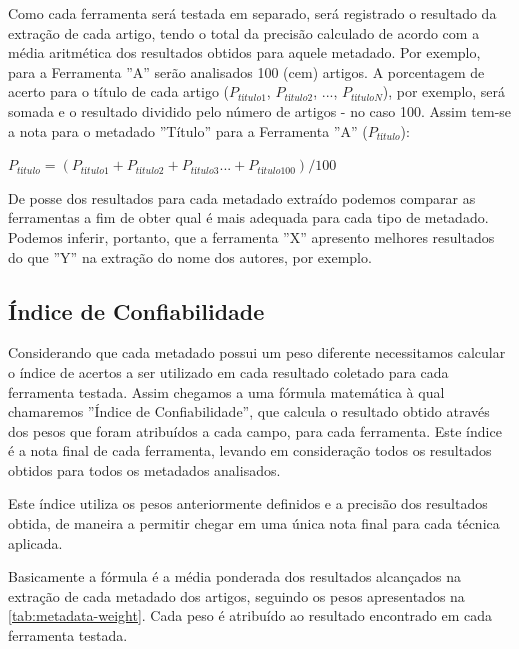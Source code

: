 Como cada ferramenta será testada em separado, será registrado o resultado da extração de cada artigo, tendo o total da precisão calculado de acordo com a média aritmética dos resultados obtidos para aquele metadado. Por exemplo, para a Ferramenta ''A'' serão analisados 100 (cem) artigos. A porcentagem de acerto para o título de cada artigo ($P_{título1}$, $P_{título2}$, ..., $P_{títuloN}$), por exemplo, será somada e o resultado dividido pelo número de artigos - no caso 100. Assim tem-se a nota para o metadado ''Título'' para a Ferramenta ''A'' ($P_{título}$):

\begin{center}
    \begin{math}
        P_{título} = (P_{título1} + P_{título2} + P_{título3} ... + P_{título100}) / 100
        \label{math:result-by-metadata}
    \end{math}
\end{center}

De posse dos resultados para cada metadado extraído podemos comparar as ferramentas a fim de obter qual é mais adequada para cada tipo de metadado. Podemos inferir, portanto, que a ferramenta ''X'' apresento melhores resultados do que ''Y'' na extração do nome dos autores, por exemplo.

\subsection{Índice de Confiabilidade}
\label{ssec:confiability-index}


Considerando que cada metadado possui um peso diferente necessitamos calcular o índice de acertos a ser utilizado em cada resultado coletado para cada ferramenta testada. Assim chegamos a uma fórmula matemática à qual chamaremos ''Índice de Confiabilidade'', que calcula o resultado obtido através dos pesos que foram atribuídos a cada campo, para cada ferramenta. Este índice é a nota final de cada ferramenta, levando em consideração todos os resultados obtidos para todos os metadados analisados.

Este índice utiliza os pesos anteriormente definidos e a precisão dos resultados obtida, de maneira a permitir chegar em uma única nota final para cada técnica aplicada.

Basicamente a fórmula é a média ponderada dos resultados alcançados na extração de cada metadado dos artigos, seguindo os pesos apresentados na \autoref{tab:metadata-weight}. Cada peso é atribuído ao resultado encontrado em cada ferramenta testada. 


